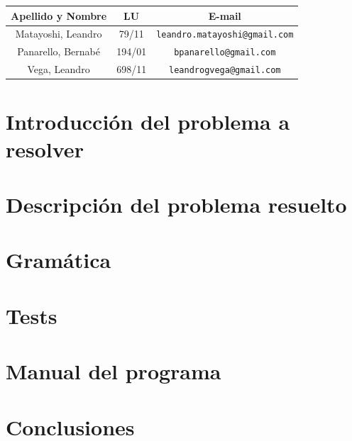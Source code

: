 \documentclass[a4paper, 10pt, twoside]{article}
\begin{document}
\begin{center}
\vspace{0.5cm}

\begin{tabular}{|c|c|c|}
\hline
Apellido y Nombre & LU & E-mail\\
\hline
Matayoshi, Leandro  & 79/11 & {\tt leandro.matayoshi@gmail.com}\\
Panarello, Bernabé  & 194/01 & {\tt bpanarello@gmail.com}\\
Vega, Leandro    & 698/11 & {\tt leandrogvega@gmail.com}\\
\hline
\end{tabular}

\end{center}

\newpage
{}



\tableofcontents

\newpage



\section{Introducción del problema a resolver}

\newpage

\section{Descripción del problema resuelto}

\newpage

\section{Gramática}

\newpage

\section{Tests}

\newpage

\section{Manual del programa}

\newpage

\section{Conclusiones}

\end{document}
